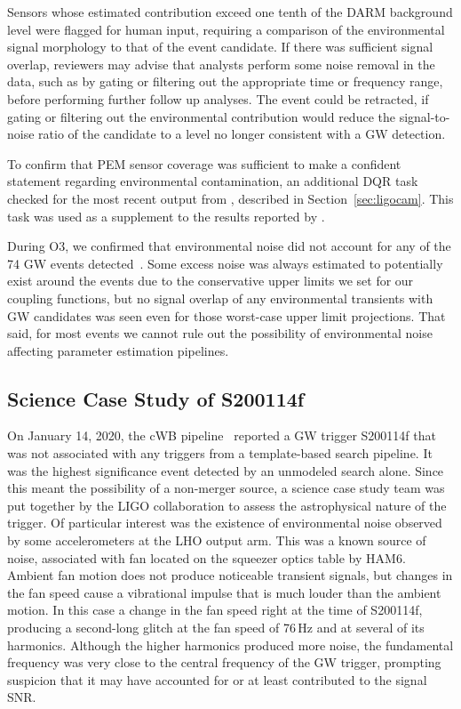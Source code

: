 Sensors whose estimated contribution exceed one tenth of the \ac{DARM} background level were flagged for human input, requiring a comparison of the environmental signal morphology to that of the event candidate.
If there was sufficient signal overlap, reviewers may advise that analysts perform some noise removal in the data, such as by gating or filtering out the appropriate time or frequency range, before performing further follow up analyses.
The event could be retracted, if gating or filtering out the environmental contribution would reduce the signal-to-noise ratio of the candidate to a level no longer consistent with a GW detection.

To confirm that PEM sensor coverage was sufficient to make a confident statement regarding environmental contamination, an additional DQR task checked for the most recent output from \ligocam, described in Section~\ref{sec:ligocam}.
This task was used as a supplement to the results reported by .

During \ac{O3}, we confirmed that environmental noise did not account for any of the 74 GW events detected~\citep{gwtc2, gwtc3}.
Some excess noise was always estimated to potentially exist around the events due to the conservative upper limits we set for our coupling functions, but no signal overlap of any environmental transients with GW candidates was seen even for those worst-case upper limit projections.
That said, for most events we cannot rule out the possibility of environmental noise affecting parameter estimation pipelines.


\subsection{Science Case Study of S200114f}

On January 14, 2020, the \ac{cWB} pipeline~\citep{imbh_o3} reported a GW trigger S200114f that was not associated with any triggers from a template-based search pipeline.
It was the highest significance event detected by an unmodeled search alone.
Since this meant the possibility of a non-merger source, a science case study team was put together by the LIGO collaboration to assess the astrophysical nature of the trigger.
Of particular interest was the existence of environmental noise observed by some accelerometers at the LHO output arm.
This was a known source of noise, associated with fan located on the squeezer optics table by HAM6.
Ambient fan motion does not produce noticeable transient signals, but changes in the fan speed cause a vibrational impulse that is much louder than the ambient motion.
In this case a change in the fan speed right at the time of S200114f, producing a second-long glitch at the fan speed of 76\,Hz and at several of its harmonics.
Although the higher harmonics produced more noise, the fundamental frequency was very close to the central frequency of the GW trigger, prompting suspicion that it may have accounted for or at least contributed to the signal SNR.

